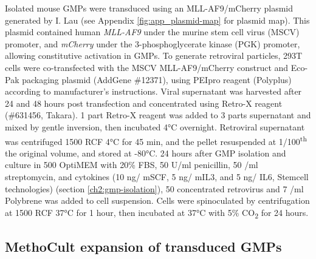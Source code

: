 Isolated mouse GMPs were transduced using an MLL-AF9/mCherry plasmid generated by I. Lau \citep{lau_role_2022} (see Appendix \ref{fig:app_plasmid-map} for plasmid map). This plasmid contained human \textit{MLL-AF9} under the murine stem cell virus (MSCV) promoter, and \textit{mCherry} under the 3-phosphoglycerate kinase (PGK) promoter, allowing constitutive activation in GMPs. To generate retroviral particles, 293T cells were co-transfected with the MSCV MLL-AF9/mCherry construct and Eco-Pak packaging plasmid (AddGene \#12371), using PEIpro reagent (Polyplus) according to manufacturer's instructions. Viral supernatant was harvested after 24 and 48 hours post transfection and concentrated using Retro-X reagent (\#631456, Takara). 1 part Retro-X reagent was added to 3 parts supernatant and mixed by gentle inversion, then incubated 4°C overnight. Retroviral supernatant was centrifuged 1500 RCF 4°C for 45 min, and the pellet resuspended at 1/100\textsuperscript{th} the original volume, and stored at -80°C. 24 hours after GMP isolation and culture in 500 \microl{} OptiMEM with 20\% FBS, 50 U/ml penicillin, 50 \microg/ml streptomycin, and cytokines (10 ng/\microl{} mSCF, 5 ng/\microl{} mIL3, and 5 ng/\microl{} IL6, Stemcell technologies) (section \ref{ch2:gmp-isolation}), 50 \microl{} concentrated retrovirus and 7 \microg{}/ml Polybrene was added to cell suspension. Cells were spinoculated by centrifugation at 1500 RCF 37°C for 1 hour, then incubated at 37°C with 5\% CO\textsubscript{2} for 24 hours.

\subsection{\label{ch2:gmp-methocult}MethoCult expansion of transduced GMPs}

